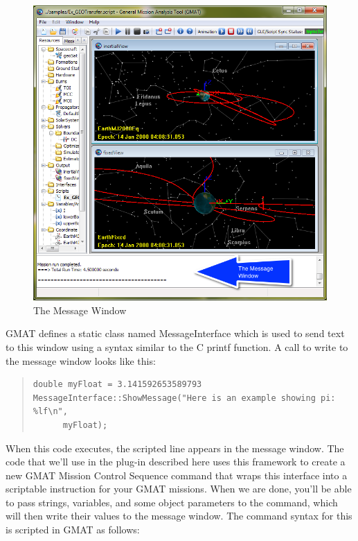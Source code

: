 \documentclass[10pt,letterpaper]{article}
\begin{document}
\begin{figure}[htb]
\begin{center}
\includegraphics[scale=.5]{images/TheMessageWindow.png}
\caption{\label{msgWindow}The Message Window}
\end{center}
\end{figure}

\noindent GMAT defines a static class named MessageInterface which is used to send text to this window using a syntax similar to the C printf function.  A call to write to the message window looks like this:

\begin{quote}
\begin{verbatim}
double myFloat = 3.141592653589793
MessageInterface::ShowMessage("Here is an example showing pi: %lf\n",
      myFloat);
\end{verbatim}
\end{quote}

\noindent When this code executes, the scripted line appears in the message window.  The code that we'll use in the plug-in described here uses this framework to create a new GMAT Mission Control Sequence command that wraps this interface into a scriptable instruction for your GMAT missions.  When we are done, you'll be able to pass strings, variables, and some object parameters to the command, which will then write their values to the message window.  The command syntax for this is scripted in GMAT as follows:
\end{document}
